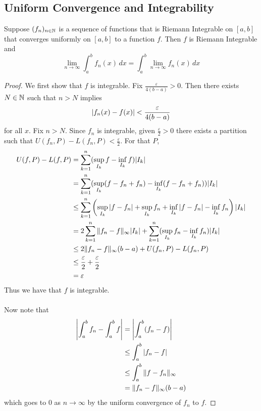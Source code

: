 \documentclass[a4paper]{article}
\begin{document}
\subsection{Uniform Convergence and Integrability}
\begin{thm}{}{} Suppose $(f_n)_{n\in\mathbb{N}}$ is a sequence of functions that is Riemann Integrable on $[a,b]$ that converges uniformly on $[a,b]$ to a function $f$. Then $f$ is Riemann Integrable and $$\lim_{n\to\infty}\int_a^bf_n(x)\,dx=\int_a^b\lim_{n\to\infty}f_n(x)\,dx$$ \tcbline
\begin{proof} We first show that $f$ is integrable. Fix $\frac{\varepsilon}{4(b-a)}>0$. Then there exists $N\in\mathbb{N}$ such that $n>N$ implies $$\abs{f_n(x)-f(x)}<\frac{\varepsilon}{4(b-a)}$$ for all $x$. Fix $n>N$. Since $f_n$ is integrable, given $\frac{\varepsilon}{2}>0$ there exists a partition such that $U(f_n,P)-L(f_n,P)<\frac{\varepsilon}{2}$. For that $P$,
\begin{align*}
U(f,P)-L(f,P)&=\sum_{k=1}^n(\sup_{I_k}f-\inf_{I_k}f)\abs{I_k}\\
&=\sum_{k=1}^n(\sup_{I_k}(f-f_n+f_n)-\inf_{I_k}(f-f_n+f_n))\abs{I_k}\\
&\leq\sum_{k=1}^n\left(\sup_{I_k}\abs{f-f_n}+\sup_{I_k}f_n+\inf_{I_k}\abs{f-f_n}-\inf_{I_k}f_n\right)\abs{I_k}\\
&=2\sum_{k=1}^n\|f_n-f\|_\infty\abs{I_k}+\sum_{k=1}^n(\sup_{I_k}f_n-\inf_{I_k}f_n)\abs{I_k}\\
&\leq 2\|f_n-f\|_\infty(b-a)+U(f_n,P)-L(f_n,P)\\
&\leq\frac{\varepsilon}{2}+\frac{\varepsilon}{2}\\
&=\varepsilon
\end{align*}
Thus we have that $f$ is integrable. 
\\~\\
Now note that
\begin{align*}
\abs{\int_a^bf_n-\int_a^bf}&=\abs{\int_a^b(f_n-f)}\\
&\leq\int_a^b\abs{f_n-f}\\
&\leq\int_a^b\|f-f_n\|_\infty\\
&=\|f_n-f\|_\infty(b-a)
\end{align*}
which goes to $0$ as $n\to\infty$ by the uniform convergence of $f_n$ to $f$. 
\end{proof}
\end{thm}
\end{document}
